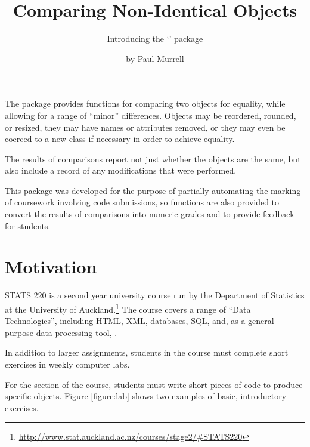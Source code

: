 

\title{Comparing Non-Identical Objects}
\subtitle{Introducing the `' package}
\author{by Paul Murrell}

\maketitle

The  package provides functions
for comparing two \R{} objects for equality,
while allowing for a range of ``minor''
differences.  Objects may be reordered, rounded, or resized, they may
have names or attributes removed, or they may 
even be coerced to a new class if necessary in order
to achieve equality.  

The results 
of comparisons report not just whether the objects are the same, but also
include a record of any modifications
that were performed.

This package was developed for the purpose of partially
automating the marking of coursework 
involving \R{} code submissions, so functions are also
provided to convert the results of comparisons into numeric 
grades and to provide feedback for students.

\section*{Motivation}

STATS 220 is a second year university course run  by
the Department of Statistics at the University of 
Auckland.\footnote{\url{http://www.stat.auckland.ac.nz/courses/stage2/\#STATS220}}
The course covers a range of ``Data Technologies'', including
HTML, XML, databases, SQL, and, as a general purpose data
processing tool, \R{}.

In addition to larger assignments, students in the course must complete
short exercises in weekly computer labs.  

For the \R{} section of the course, students must write short pieces
of \R{} code to produce specific \R{} objects.  Figure
\ref{figure:lab} shows two examples of basic, introductory exercises.

